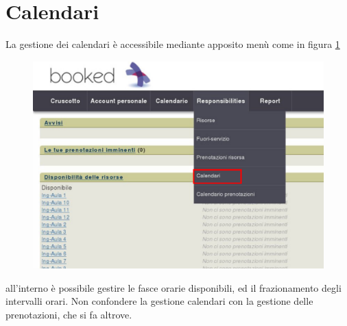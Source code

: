 \section{Calendari}
La gestione dei calendari è accessibile mediante apposito menù come in figura
\ref{fig:amministratore_menu_generale_selezione_calendari.pdf}
\begin{figure}[H]
\centering{}\includegraphics[scale=0.5]{Immagini/amministratore_menu_generale_selezione_calendari.pdf}
\normalsize
\caption{}
\label{fig:amministratore_menu_generale_selezione_calendari.pdf}
\end{figure}

all'interno è possibile gestire le fasce orarie disponibili, ed il frazionamento degli intervalli orari.
Non confondere la gestione calendari con la gestione delle prenotazioni, che si fa altrove.

